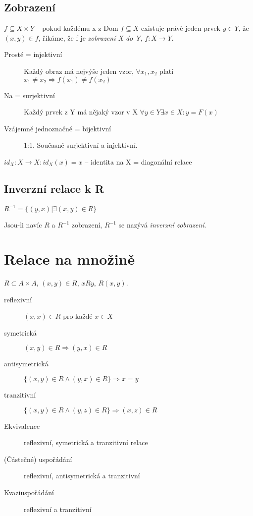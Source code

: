 \documentclass[a4paper, 11pt]{report}
\begin{document}
\subsection{Zobrazení}
$f \subseteq X \times Y$ -- pokud každému x z Dom $f \subseteq X$ existuje právě jeden prvek $y \in Y$, že $(x,y) \in f$, říkáme, že f je \emph{zobrazení X do Y}, $f: X \to Y$.

\begin{description}
	\item[Prosté = injektivní] Každý obraz má nejvýše jeden vzor, $\forall x_1, x_2$ platí $x_1 \neq x_2 \Rightarrow f(x_1) \neq f(x_2)$ 
	\item[Na = surjektivní] Každý prvek z Y má nějaký vzor v X $\forall y \in Y \exists x \in X: y = F(x)$
	\item[Vzájemně jednoznačné = bijektivní] 1:1. Současně surjektivní a injektivní.
\end{description}

$id_X: X \to X: id_X(x) = x$ -- identita na X = diagonální relace

\subsection{Inverzní relace k R}

$R^{-1} = \{ (y,x) | \exists (x,y) \in R\}$

Jsou-li navíc $R$ a $R^{-1}$ zobrazení, $R^{-1}$ se nazývá \emph{inverzní zobrazení}.

\section{Relace na množině}

$R \subset A \times A$, $(x,y) \in R$, $xRy$, $R(x,y)$.

\begin{description}
	\item[reflexivní] $(x,x) \in R$ pro každé $x \in X$
	\item[symetrická] $(x,y) \in R \Rightarrow (y,x) \in R$
	\item[antisymetrická] $\{(x,y) \in R \land (y,x) \in R\} \Rightarrow x = y$
	\item[tranzitivní] $\{(x,y) \in R \land (y,z) \in R\} \Rightarrow (x,z) \in R$
\end{description}

\begin{description}
	\item[Ekvivalence] reflexivní, symetrická a tranzitivní relace
	\item[(Částečné) uspořádání] reflexivní, antisymetrická a tranzitivní
	\item[Kvaziuspořádání] reflexivní a tranzitivní
\end{description}
\end{document}
